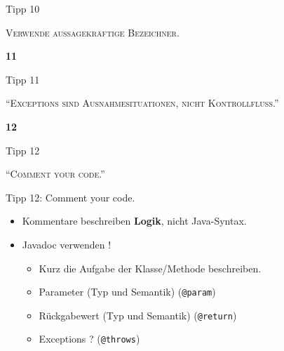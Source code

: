 \documentclass[18pt]{beamer}
\newcommand{\quotes}[1]{``#1''}
\begin{document}
\begin{frame}{Tipp 10}
    \begin{block}{}
        \center
        \textsc{Verwende aussagekräftige Bezeichner.}
    \end{block}
\end{frame}

\begin{frame}{\quad}
    \center
    \Huge{\textbf{11}}
\end{frame}

\begin{frame}{Tipp 11}
    \begin{block}{}
        \center
        \textsc{\quotes{Exceptions sind Ausnahmesituationen, nicht Kontrollfluss.}}
    \end{block}
\end{frame}

\begin{frame}{\quad}
    \center
    \Huge{\textbf{12}}
\end{frame}

\begin{frame}{Tipp 12}
    \begin{block}{}
        \center
        \textsc{\quotes{Comment your code.}}
    \end{block}
\end{frame}

\begin{frame}{Tipp 12: Comment your code.}
    \begin{itemize}
        \item Kommentare beschreiben \textbf{Logik}, nicht Java-Syntax.
        \item Javadoc verwenden !
        \begin{itemize}
            \item Kurz die Aufgabe der Klasse/Methode beschreiben.
            \item Parameter (Typ und Semantik) (\texttt{@param})
            \item Rückgabewert (Typ und Semantik) (\texttt{@return})
            \item Exceptions ? (\texttt{@throws})
        \end{itemize}
    \end{itemize}
\end{frame}
\end{document}
